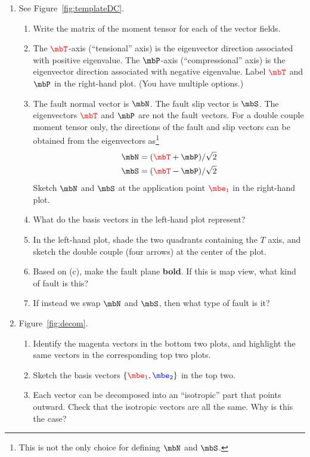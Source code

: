 \documentclass[11pt,titlepage,fleqn]{article}
\newcommand{\fvect}{\textcolor{red}{\mbT}}
\newcommand{\fvecp}{\textcolor{black}{\mbP}}
\newcommand{\fvecn}{\mbN}
\newcommand{\fvecs}{\mbS}
\newcommand{\eone}{\textcolor{red}{\mbe_1}}
\newcommand{\etwo}{\textcolor{blue}{\mbe_2}}
\begin{document}
\begin{enumerate}

\item 
\label{prob:DC}
See Figure~\ref{fig:templateDC}.
%
\begin{enumerate}
\item Write the matrix of the moment tensor for each of the vector fields.

\item The $\fvect$-axis (``tensional'' axis) is the eigenvector direction associated with positive eigenvalue. The $\fvecp$-axis (``compressional'' axis) is the eigenvector direction associated with negative eigenvalue. Label $\fvect$ and $\fvecp$ in the right-hand plot. (You have multiple options.)

\item The fault normal vector is $\fvecn$. The fault slip vector is $\fvecs$.
The eigenvectors $\fvect$ and $\fvecp$ are not the fault vectors. For a double couple moment tensor only, the directions of the fault and slip vectors can be obtained from the eigenvectors as\footnote{This is not the only choice for defining $\fvecn$ and $\fvecs$.}
%
\begin{eqnarray*}
\fvecn = (\fvect + \fvecp)/\sqrt{2}
\\
\fvecs = (\fvect - \fvecp)/\sqrt{2}
\end{eqnarray*}
%
Sketch $\fvecn$ and $\fvecs$ at the application point $\eone$ in the right-hand plot.

\item What do the basis vectors in the left-hand plot represent?

\item In the left-hand plot, shade the two quadrants containing the $T$ axis, and sketch the double couple (four arrows) at the center of the plot.

\item Based on (c), make the fault plane {\bf bold}. If this is map view, what kind of fault is this?

\item If instead we swap $\fvecn$ and $\fvecs$, then what type of fault is it?
\end{enumerate}


\item 
\label{prob:decom}
Figure~\ref{fig:decom}.
%
\begin{enumerate}
\item Identify the magenta vectors in the bottom two plots, and highlight the same vectors in the corresponding top two plots.
\item Sketch the basis vectors $\{\eone,\etwo\}$ in the top two.
\item Each vector can be decomposed into an ``isotropic'' part that points outward. Check that the isotropic vectors are all the same. Why is this the case?
\end{enumerate}


\end{enumerate}
\end{document}
